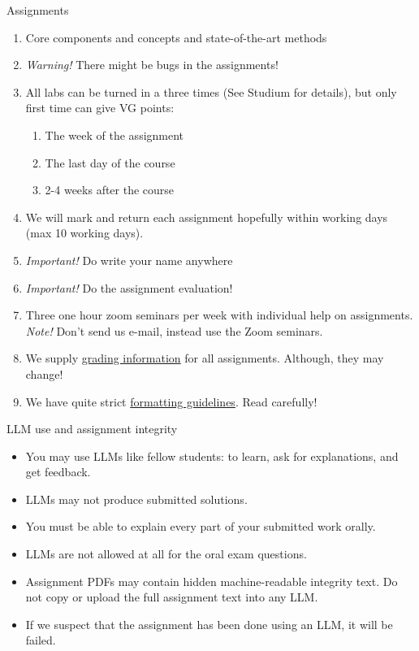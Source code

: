 \documentclass[10pt]{beamer}
\begin{document}
\begin{frame}{Assignments}

\begin{enumerate}
\item Core components and concepts and state-of-the-art methods\pause
\item \emph{Warning!} There might be bugs in the assignments!\pause
\item All labs can be turned in a three times (See Studium for details), but only first time can give VG points:
\begin{enumerate}
\item The week of the assignment
\item The last day of the course
\item 2-4 weeks after the course
\end{enumerate}
\pause
\item We will mark and return each assignment hopefully within  working days (max 10 working days).\pause
\item \emph{Important!} Do  write your name anywhere\pause
\item \emph{Important!} Do the assignment evaluation!\pause
\item Three one hour zoom seminars per week with individual help on assignments. \emph{Note!} Don't send us e-mail, instead use the Zoom seminars. \pause
\item We supply \href{https://github.com/MansMeg/BSDA/tree/main/grading}{grading information} for all assignments. Although, they may change! \pause
\item We have quite strict \href{https://github.com/MansMeg/BSDA/blob/main/templates/assignment_template.pdf}{formatting guidelines}. Read carefully!\pause
\end{enumerate}
\end{frame}

\begin{frame}{LLM use and assignment integrity}

\begin{itemize}
\item {} You may use LLMs like fellow students: to learn, ask for explanations, and get feedback.\pause
\item LLMs may not produce submitted solutions.\pause
\item You must be able to explain every part of your submitted work orally.\pause
\item LLMs are not allowed at all for the oral exam questions.\pause
\item Assignment PDFs may contain hidden machine-readable integrity text. Do not copy or upload the full assignment text into any LLM.
\item If we suspect that the assignment has been done using an LLM, it will be failed.
\end{itemize}
\end{frame}
\end{document}
